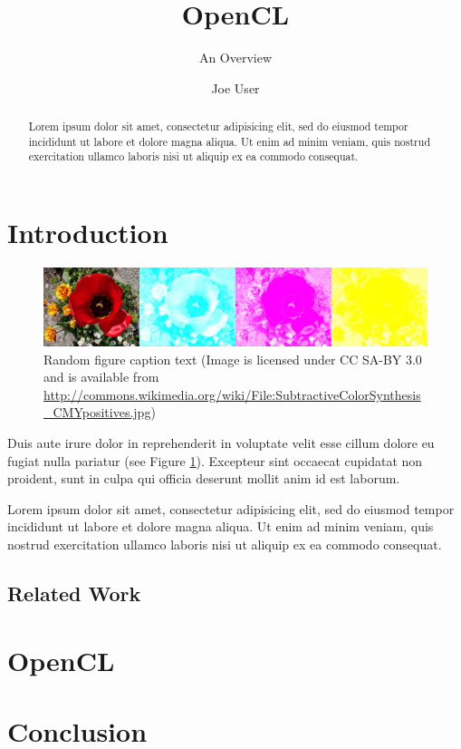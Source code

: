 \documentclass{scrartcl}
\title{OpenCL}
\subtitle{An Overview}
\author{Joe User}
\begin{document}
\maketitle

\begin{abstract}
Lorem ipsum dolor sit amet, consectetur adipisicing elit, sed do eiusmod tempor incididunt ut labore et dolore magna aliqua. Ut enim ad minim veniam, quis nostrud exercitation ullamco laboris nisi ut aliquip ex ea commodo consequat.
\end{abstract}

\section{Introduction}

\begin{figure}
  \includegraphics[width=1\textwidth]{SubtractiveColorSynthesis_CMYpositives.jpg}
  \caption{Random figure caption text {\tiny (Image is licensed under CC
  SA-BY 3.0 and is available from
  \url{http://commons.wikimedia.org/wiki/File:SubtractiveColorSynthesis_CMYpositives.jpg})}}
  \label{fig:foo}
\end{figure}

Duis aute irure dolor in reprehenderit in voluptate velit esse
cillum dolore eu fugiat nulla pariatur (see Figure
\ref{fig:foo}). Excepteur sint occaecat
cupidatat non proident, sunt in culpa qui officia deserunt mollit
anim id est laborum\cite{NUS:PIE:GRI:KLE:1978}.

Lorem ipsum dolor sit amet, consectetur adipisicing elit, sed do
eiusmod tempor incididunt ut labore et dolore magna aliqua. Ut
enim ad minim veniam, quis nostrud exercitation ullamco laboris
nisi ut aliquip ex ea commodo consequat\cite{YOU:1967}.

\subsection{Related Work}

\section{OpenCL}

\section{Conclusion}

\printbibliography
\end{document}
